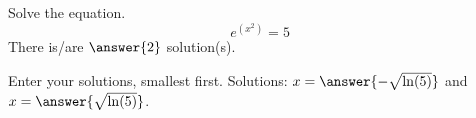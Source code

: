 \documentclass{ximera}
\author{Bobby Ramsey}
\begin{document}
\begin{exercise}
	Solve the equation.
	\[ e^{(x^2)} = 5 \]
	There is/are $\answer{2}$ solution(s).
	\begin{exercise}
		Enter your solutions, smallest first.
		Solutions: $x = \answer{- \sqrt{\ln(5)} }$ and $x = \answer{ \sqrt{\ln(5)} }$.
	\end{exercise}
\end{exercise}
\end{document}
